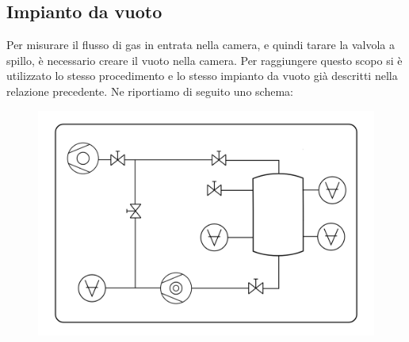 \documentclass[a4paper,11pt]{article}
\begin{document}
\subsection{Impianto da vuoto}
Per misurare il flusso di gas in entrata nella camera, e quindi tarare la valvola a spillo, è necessario creare il vuoto nella camera. Per raggiungere questo scopo si è utilizzato lo stesso procedimento e lo stesso impianto da vuoto già descritti nella relazione precedente. Ne riportiamo di seguito uno schema:

\vspace{-10 pt} 
 \begin{center} 
\begin{figure}[htpd]
\hspace{80 pt}
\includegraphics[scale=0.31]{schema_finale.png}
\end{figure}
\end{center}
\end{document}
